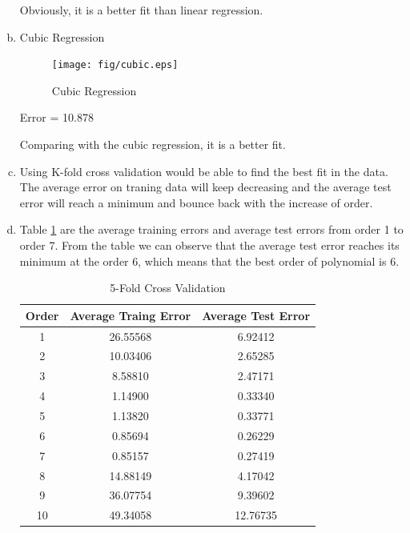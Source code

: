 \documentclass[a4paper, 12pt, titlepage]{article}
\begin{document}
\begin{enumerate}[(a)]
            Obviously, it is a better fit than linear regression.

        \item Cubic Regression %
            \begin{figure}[H]
                \centering
                \texttt{[image: fig/cubic.eps]}
                \caption{Cubic Regression}\label{f}
            \end{figure}

            Error = 10.878

            Comparing with the cubic regression, it is a better fit.

        \item %
            Using K-fold cross validation would be able to find the best fit in the data. The average error on traning data will keep decreasing and the average test error will reach a minimum and bounce back with the increase of order.

        \item Table \ref{CrossValid} are the average training errors and average test errors from order 1 to order 7. From the table we can observe that the average test error reaches its minimum at the order 6, which means that the best order of polynomial is 6.
            \begin{table}[H]
                \centering
                \begin{tabular}{ccc}
                Order & Average Traing Error & Average Test Error \\
                    \hline
                1 & 26.55568 & 6.92412 \\
                2 & 10.03406 & 2.65285 \\
                3 & 8.58810  & 2.47171 \\
                4 & 1.14900  & 0.33340 \\
                5 & 1.13820  & 0.33771 \\
                6 & 0.85694  & 0.26229 \\
                7 & 0.85157  & 0.27419 \\
                8 & 14.88149  & 4.17042\\
                9 & 36.07754  & 9.39602 \\
                10 & 49.34058  & 12.76735 \\
                \end{tabular}
                \caption{5-Fold Cross Validation}
                \label{CrossValid}
            \end{table}


\end{enumerate}
\end{document}
